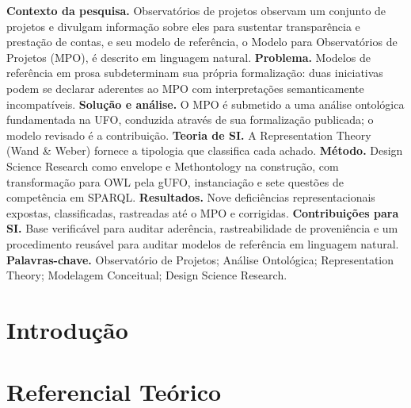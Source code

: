 \documentclass[12pt]{article}
\begin{document}
\begin{resumo}
  \textbf{Contexto da pesquisa.} Observatórios de projetos observam um conjunto
  de projetos e divulgam informação sobre eles para sustentar transparência e
  prestação de contas, e seu modelo de referência, o Modelo para Observatórios
  de Projetos (MPO), é descrito em linguagem natural.
  \textbf{Problema.} Modelos de referência em prosa subdeterminam sua própria
  formalização: duas iniciativas podem se declarar aderentes ao MPO com
  interpretações semanticamente incompatíveis.
  \textbf{Solução e análise.} O MPO é submetido a uma análise ontológica
  fundamentada na UFO, conduzida através de sua formalização publicada; o modelo
  revisado é a contribuição.
  \textbf{Teoria de SI.} A Representation Theory (Wand \& Weber) fornece a
  tipologia que classifica cada achado.
  \textbf{Método.} Design Science Research como envelope e Methontology na
  construção, com transformação para OWL pela gUFO, instanciação e sete questões
  de competência em SPARQL.
  \textbf{Resultados.} Nove deficiências representacionais expostas,
  classificadas, rastreadas até o MPO e corrigidas.
  \textbf{Contribuições para SI.} Base verificável para auditar aderência,
  rastreabilidade de proveniência e um procedimento reusável para auditar
  modelos de referência em linguagem natural.
  \textbf{Palavras-chave.} Observatório de Projetos; Análise Ontológica;
  Representation Theory; Modelagem Conceitual; Design Science Research.
\end{resumo}

\section{Introdução}
\label{sec:introducao}


\section{Referencial Teórico}
\label{sec:referencial}

\end{document}
